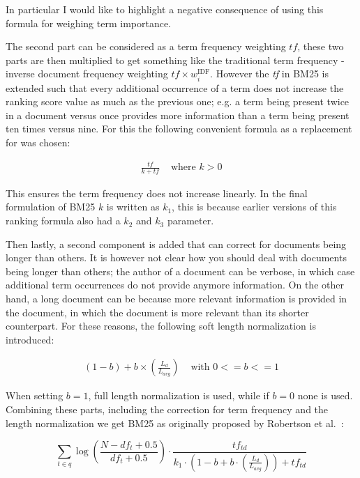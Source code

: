 In particular I would like to highlight a negative consequence of using this formula for weighing term importance. 

The second part can be considered as a term frequency weighting $tf$, these two parts are then multiplied to get something like the traditional term frequency - inverse document frequency weighting $tf \times w_i^{\text{IDF}}$.
However the \textit{tf} in BM25 is extended such that every additional occurrence of a term does not increase the ranking score value as much as the previous one; e.g. a term being present twice in a document versus once provides more information than a term being present ten times versus nine. For this the following convenient formula as a replacement for  was chosen:

\begin{align}
	\frac{tf}{k+tf} & \text{ where } k>0
\end{align}

This ensures the term frequency does not increase linearly. In the final formulation of BM25 $k$ is written as $k_1$, this is because earlier versions of this ranking formula also had a $k_2$ and $k_3$ parameter. 

Then lastly, a second component is added that can correct for documents being longer than others. It is however not clear how you should deal with documents being longer than others; the author of a document can be verbose, in which case additional term occurrences do not provide anymore information. On the other hand, a long document can be because more relevant information is provided in the document, in which the document is more relevant than its shorter counterpart. For these reasons, the following soft length normalization is introduced:

\begin{align}
	\left(1-b\right) + b \times \left(\frac{L_d}{L_{avg}}\right) & \text{ with } 0 <= b <= 1
\end{align}

When setting $b=1$, full length normalization is used, while if $b=0$ none is used. Combining these parts, including the correction for term frequency and the length normalization we get BM25 as originally proposed by Robertson et al.~\cite{bm25-robertson}:

\begin{equation}
	\label{bm25-robertson}
	\sum_{t\in q} \log\left(\frac{N-df_t+0.5}{df_t+0.5}\right)\cdot\frac{tf_{td}}{k_1\cdot\left(1-b+b\cdot\left(\frac{L_d}{L_{avg}}\right)\right) + tf_{td}}
\end{equation}

